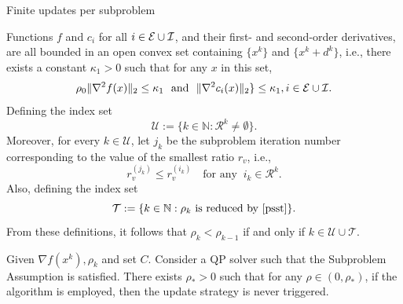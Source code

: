 \documentclass[8pt]{beamer}
\begin{document}
\begin{frame}{Finite updates per subproblem}

\begin{assumption}\label{ass.algorithm}
Functions $f$ and $c_i$ for all $i \in {\cal E}\cup{\cal I}$, and their first- and second-order  derivatives, are all  bounded in an open convex set containing $\{x^k\}$ and $\{x^k+d^k\}$, i.e., there exists a constant  $\kappa_1>0$  such that  for any $x$ in this set, 
\[  \rho_0\|\nabla^2f(x)\|_2 \le \kappa_1\ \text{  and  }\  \|\nabla^2c_i(x)\|_2 \} \le \kappa_1, i\in{\cal E}\cup{\cal I}.\] 
Defining the index set 
\[ \mathcal{U} := \{k \in \mathbb{N} : \mathcal{R}^k\ne\emptyset \} . \]
Moreover, for every $k\in\mathcal{U}$, let $j_k$ be the subproblem iteration number corresponding to the value of the smallest ratio $r_v$, i.e.,
\[   r_v^{(j_k)} \le r_v^{(i_k)} \quad \text{for any }\  i_k\in\mathcal{R}^k.\]
Also, defining the index set 
\[  \mathcal{T} := \{ k \in\mathbb{N}: \rho_k \  \text{is reduced by}\ \eqref{psst} \}. \]
From these definitions, it follows that $\rho_k < \rho_{k-1}$ if and only if $k\in\mathcal{U}\cup\mathcal{T}$.
\end{assumption}

\vfill

\begin{theorem}
Given $\nabla f(x^k), \rho_k$ and set $C$.  Consider a QP solver such that the Subproblem Assumption  is satisfied.   There exists $\rho_*>0$ such that for any $\rho\in(0,\rho_*)$,  if the algorithm is employed, then the update strategy is never triggered. 
\end{theorem}

\end{frame}
\end{document}
